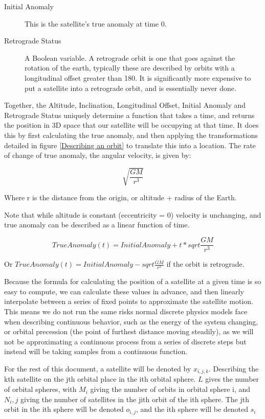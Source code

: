 \documentclass[12pt]{report}
\begin{document}
\begin{description}
\item[Initial Anomaly]
This is the satellite's true anomaly at time 0.
\item[Retrograde Status]
A Boolean variable. A retrograde orbit is one that goes against the rotation of the earth, typically these are described by orbits with a longitudinal offset greater than 180\degree. It is significantly more expensive to put a satellite into a retrograde orbit, and is essentially never done.\cite{Book}
\end{description}

Together, the Altitude, Inclination, Longitudinal Offset, Initial Anomaly and Retrograde Status uniquely determine a function that takes a time, and returns the position in 3D space that our satellite will be occupying at that time. It does this by first calculating the true anomaly, and then applying the transformations detailed in figure \ref{Describing an orbit} to translate this into a location. The rate of change of true anomaly, the angular velocity, is given by:

\[\sqrt{\frac{GM}{r^3}}\]

Where r is the distance from the origin, or altitude + radius of the Earth.

Note that while altitude is constant (eccentricity = 0) velocity is unchanging, and true anomaly can be described as a linear function of time.

\[TrueAnomaly(t) = InitialAnomaly + t * sqrt{\frac{GM}{r^3}}\]

Or $TrueAnomaly(t) = InitialAnomaly - sqrt{\frac{GM}{r^3}}$ if the orbit is retrograde.

Because the formula for calculating the position of a satellite at a given time is so easy to compute, we can calculate these values in advance, and then linearly interpolate between a series of fixed points to approximate the satellite motion. This means we do not run the same risks normal discrete physics models face when describing continuous behavior, such as the energy of the system changing, or orbital precession (the point of furthest distance moving steadily), as we will not be approximating a continuous process from a series of discrete steps but instead will be taking samples from a continuous function.

For the rest of this document, a satellite will be denoted by $x_{i,j,k}$. Describing the kth satellite on the jth orbital place in the ith orbital sphere. $L$ gives the number of orbital spheres, with $M_i$ giving the number of orbits in orbital sphere i, and $N_i,j$ giving the number of satellites in the jith orbit of the ith sphere. The jth orbit in the ith sphere will be denoted $o_{i,j}$, and the ith sphere will be denoted $s_i$
\end{document}
